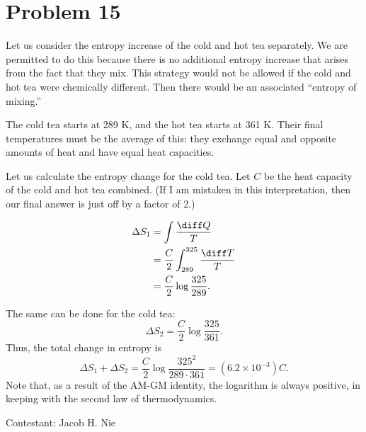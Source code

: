 \documentclass[12pt]{article}
\title{}
\date{}
\author{Jacob H. Nie}
\begin{document}
\section*{Problem 15}

Let us consider the entropy increase of the cold and hot tea separately.  We are permitted to do this because there is no additional entropy increase that arises from the fact that they mix.  This strategy would not be allowed if the cold and hot tea were chemically different.  Then there would be an associated ``entropy of mixing.''

The cold tea starts at 289 K, and the hot tea starts at 361 K.  Their final temperatures must be the average of this: they exchange equal and opposite amounts of heat and have equal heat capacities.

Let us calculate the entropy change for the cold tea.  Let $C$ be the heat capacity of the cold and hot tea combined.  (If I am mistaken in this interpretation, then our final answer is just off by a factor of 2.)

\begin{align*}
	\Delta S_1 &= \int \frac{\diff Q}{T} \\
		   &= \frac{C}{2}\int_{289}^{325} \frac{\diff T}{T} \\
		   &= \frac{C}{2} \log \frac{325}{289}.
\end{align*}

The same can be done for the cold tea:
\[
	\Delta S_2 = \frac{C}{2}\log \frac{325}{361}.
\]
Thus, the total change in entropy is
\[
	\Delta S_1 + \Delta S_2 = \frac{C}{2} \log \frac{325^2}{289\cdot 361} = (6.2 \times 10^{-3})C.
\]
Note that, as a result of the AM-GM identity, the logarithm is always positive, in keeping with the second law of thermodynamics.

\vspace{1cm}

\hfill Contestant: Jacob H. Nie
\end{document}
